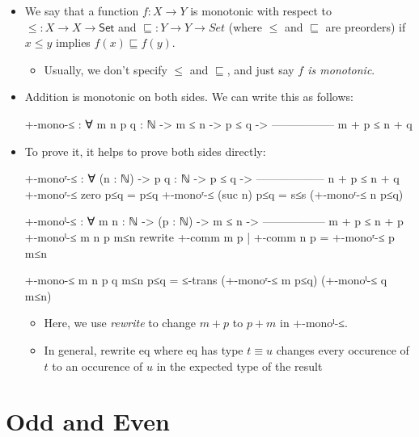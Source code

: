 \documentclass{lecturenotes}
\begin{document}
\begin{itemize}
\item We say that a function $f \colon X \to Y$ is monotonic with respect to $\leq \colon X \to X \to \textsf{Set}$ and $\sqsubseteq \colon Y \to Y \to Set$ (where $\leq$ and $\sqsubseteq$ are preorders) if $x \leq y$ implies $f(x) \sqsubseteq f(y)$.
  \begin{itemize}
  \item Usually, we don't specify $\leq$ and $\sqsubseteq$, and just say \emph{$f$ is monotonic}.
  \end{itemize}
\item Addition is monotonic on both sides.
  We can write this as follows:
\begin{code}
+-mono-≤ : ∀ {m n p q : ℕ} ->
             m ≤ n ->
             p ≤ q ->
           -----------------
             m + p ≤ n + q
\end{code}
\item To prove it, it helps to prove both sides directly:
\begin{code}
+-monoʳ-≤ : ∀ (n : ℕ) -> {p q : ℕ} ->
              p ≤ q ->
            ------------------
              n + p ≤ n + q
+-monoʳ-≤ zero p≤q = p≤q
+-monoʳ-≤ (suc n) p≤q = s≤s (+-monoʳ-≤ n p≤q)

+-monoˡ-≤ : ∀ {m n : ℕ} -> (p : ℕ) ->
              m ≤ n ->
            -----------------
              m + p ≤ n + p
+-monoˡ-≤ {m} {n} p m≤n rewrite +-comm m p | +-comm n p = +-monoʳ-≤ p m≤n

+-mono-≤ {m} {n} {p} {q} m≤n p≤q = ≤-trans (+-monoʳ-≤ m p≤q) (+-monoˡ-≤ q m≤n)
\end{code}
\begin{itemize}
\item Here, we use \emph{\textsf{rewrite}} to change $m + p$ to $p + m$ in \textsf{+-monoˡ-≤}.
\item In general, \textsf{rewrite eq} where \textsf{eq} has type $t \equiv u$ changes every occurence of $t$ to an occurence of $u$ in the expected type of the result
\end{itemize}
  
\end{itemize}

\section{Odd and Even}
\label{sec:odd-even}
\end{document}

